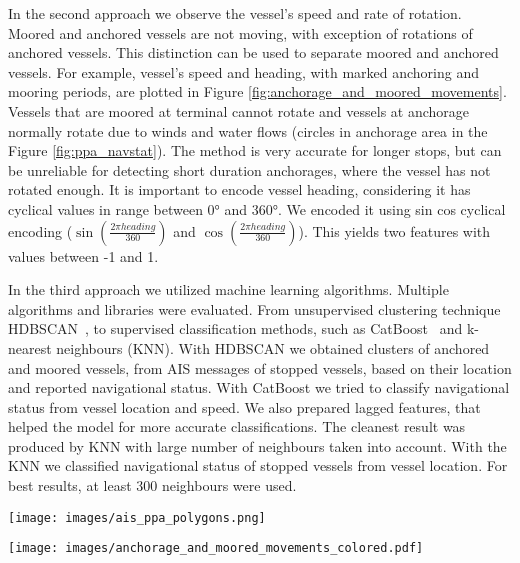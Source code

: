 \documentclass[conference]{IEEEtran}
\begin{document}
In the second approach we observe the vessel's speed and rate of rotation. Moored and anchored vessels are not moving, with exception of rotations of anchored vessels. This distinction can be used to separate moored and anchored vessels. For example, vessel's speed and heading, with marked anchoring and mooring periods, are plotted in Figure \ref{fig:anchorage_and_moored_movements}. Vessels that are moored at terminal cannot rotate and vessels at anchorage normally rotate due to winds and water flows (circles in anchorage area in the Figure \ref{fig:ppa_navstat}). The method is very accurate for longer stops, but can be unreliable for detecting short duration anchorages, where the vessel has not rotated enough. It is important to encode vessel heading, considering it has cyclical values in range between 0° and 360°. We encoded it using sin cos cyclical encoding ($\sin({\frac{2\pi heading}{360}})$ and $\cos({\frac{2\pi heading}{360}})$). This yields two features with values between -1 and 1. 


In the third approach we utilized machine learning algorithms. Multiple algorithms and libraries were evaluated. From unsupervised clustering technique HDBSCAN~\cite{clustering1}, to supervised classification methods, such as CatBoost~\cite{catboost} and k-nearest neighbours (KNN). With HDBSCAN we obtained clusters of anchored and moored vessels, from AIS messages of stopped vessels, based on their location and reported navigational status.  With CatBoost we tried to classify navigational status from vessel location and speed. We also prepared lagged features, that helped the model for more accurate classifications. The cleanest result was produced by KNN with large number of neighbours taken into account. With the KNN we classified navigational status of stopped vessels from vessel location. For best results, at least 300 neighbours were used.

\begin{figure*}[ht!]
    \centering
    \begin{minipage}[b]{.45\textwidth}
        \centering
         \texttt{[image: images/ais\_ppa\_polygons.png]}
        \caption{Manually drawn polygons in PPA port area. Anchorage area with blue color and terminals with yellow.}\label{fig:ais_ppa_polygons}
    \end{minipage}\qquad
    \begin{minipage}[b]{.45\textwidth}
        \centering
        \texttt{[image: images/anchorage\_and\_moored\_movements\_colored.pdf]}
        \caption{Vessel speed and its encoded heading during anchored (blue background) and moored (yellow background) period.}\label{fig:anchorage_and_moored_movements}
    \end{minipage}
\end{figure*}
\end{document}
